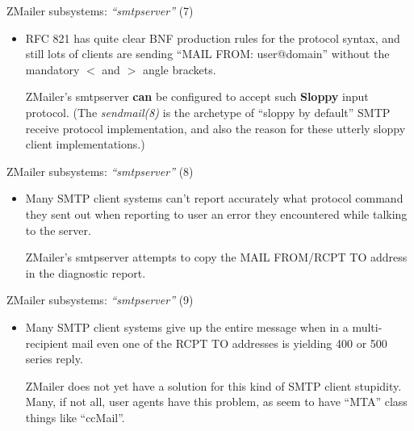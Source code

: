 \documentclass[a4paper,landscape]{slides}
\newcommand{\ZM}{ZMailer}
\begin{document}
\begin{slide}
\centerline{\large \ZM{} subsystems: {\em ``smtpserver''} (7)}
\begin{itemize}
\item
 RFC 821 has quite clear BNF production rules for the protocol syntax,
 and still lots of clients are sending
``{\small MAIL FROM: user@domain}''
 without the mandatory $<$ and $>$ angle brackets.

\ZM's smtpserver {\bf can} be configured to accept such {\bf Sloppy}
input protocol. (The {\em sendmail(8)} is the archetype of ``sloppy by
default'' SMTP receive protocol implementation, and also the reason
for these utterly sloppy client implementations.)
\end{itemize}

\vfill
\end{slide}

\begin{slide}

\centerline{\large \ZM{} subsystems: {\em ``smtpserver''} (8)}
\begin{itemize}
\item
Many SMTP client systems can't report accurately what protocol
command they sent out when reporting to user an error they encountered
while talking to the server.

\ZM's smtpserver attempts to copy the MAIL FROM/RCPT TO address
in the diagnostic report.

\end{itemize}
\vfill

\end{slide}

\begin{slide}

\centerline{\large \ZM{} subsystems: {\em ``smtpserver''} (9)}
\begin{itemize}
\item
Many SMTP client systems give up the entire message when in a multi-recipient
mail even one of the RCPT TO addresses is yielding 400 or 500 series reply.

\ZM{} does not yet have a solution for this kind of SMTP client stupidity.
Many, if not all, user agents have this problem, as seem to have ``MTA''
class things like ``ccMail''.

\end{itemize}
\vfill

\end{slide}

\end{document}
